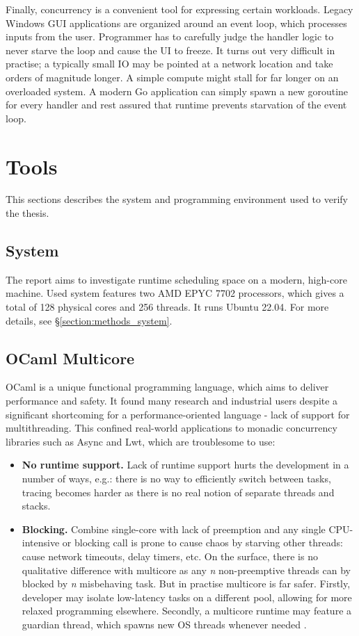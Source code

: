 \documentclass[12pt,a4paper,twoside]{report}
\begin{document}
Finally, concurrency is a convenient tool for expressing certain workloads. Legacy Windows GUI applications are organized around an event loop, which processes inputs from the user. Programmer has to carefully judge the handler logic to never starve the loop and cause the UI to freeze. It turns out very difficult in practise; a typically small IO may be pointed at a network location and take orders of magnitude longer. A simple compute might stall for far longer on an overloaded system. A modern Go application can simply spawn a new goroutine for every handler and rest assured that runtime prevents starvation of the event loop.  

\section{Tools}
This sections describes the system and programming environment used to verify the thesis. 

\subsection{System}
The report aims to investigate runtime scheduling space on a modern, high-core machine. Used system features two AMD EPYC 7702 processors, which gives a total of 128 physical cores and 256 threads. It runs Ubuntu 22.04. For more details, see \S\ref{section:methods_system}. 

\subsection{OCaml Multicore}
\label{section:intr_ocaml-multicore}

OCaml is a unique functional programming language, which aims to deliver performance and safety. It found many research and industrial users despite a significant shortcoming for a performance-oriented language - lack of support for multithreading. This confined real-world applications to monadic concurrency libraries such as Async and Lwt, which are troublesome to use: 
\begin{itemize}
    \item \textbf{No runtime support.} Lack of runtime support hurts the development in a number of ways, e.g.: there is no way to efficiently switch between tasks, tracing becomes harder as there is no real notion of separate threads and stacks. 
    \item \textbf{Blocking.} Combine single-core with lack of preemption and any single CPU-intensive or blocking call is prone to cause chaos by starving other threads: cause network timeouts, delay timers, etc. On the surface, there is no qualitative difference with multicore as any \textit{n} non-preemptive threads can by blocked by \textit{n} misbehaving task. But in practise multicore is far safer. Firstly, developer may isolate low-latency tasks on a different pool, allowing for more relaxed programming elsewhere. Secondly, a multicore runtime may feature a guardian thread, which spawns new OS threads whenever needed \cite{golang}.
\end{itemize}
\end{document}

